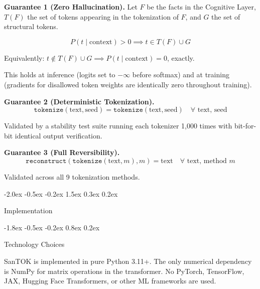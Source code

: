 \documentclass[10pt]{article}
\makeatletter
\renewcommand{\section}{\@startsection{section}{1}{\z@}%
  {-2.0ex \@plus -0.5ex \@minus -0.2ex}%
  {1.5ex \@plus 0.3ex \@minus 0.2ex}%
  {\large\bfseries\raggedright}}
\renewcommand{\subsection}{\@startsection{subsection}{2}{\z@}%
  {-1.8ex \@plus -0.5ex \@minus -0.2ex}%
  {0.8ex \@plus 0.2ex}%
  {\normalsize\bfseries\raggedright}}
\makeatother
\begin{document}
\textbf{Guarantee 1 (Zero Hallucination).}
Let $F$ be the facts in the Cognitive Layer, $T(F)$ the set of tokens appearing in
the tokenization of $F$, and $G$ the set of structural tokens.

\begin{equation}
P(t \mid \text{context}) > 0 \implies t \in T(F) \cup G
\end{equation}

Equivalently: $t \notin T(F) \cup G \implies P(t \mid \text{context}) = 0$, exactly.

This holds at inference (logits set to $-\infty$ before softmax) and at training
(gradients for disallowed token weights are identically zero throughout training).

\textbf{Guarantee 2 (Deterministic Tokenization).}
\begin{equation}
\mathtt{tokenize}(\text{text}, \text{seed}) = \mathtt{tokenize}(\text{text}, \text{seed})
\quad \forall \text{ text, seed}
\end{equation}

Validated by a stability test suite running each tokenizer 1,000 times with bit-for-bit
identical output verification.

\textbf{Guarantee 3 (Full Reversibility).}
\begin{equation}
\mathtt{reconstruct}(\mathtt{tokenize}(\text{text}, m), m) = \text{text}
\quad \forall \text{ text, method } m
\end{equation}

Validated across all 9 tokenization methods.

\section{Implementation}

\subsection{Technology Choices}

SanTOK is implemented in pure Python 3.11+. The only numerical dependency is NumPy for
matrix operations in the transformer. No PyTorch, TensorFlow, JAX, Hugging Face
Transformers, or other ML frameworks are used.
\end{document}
